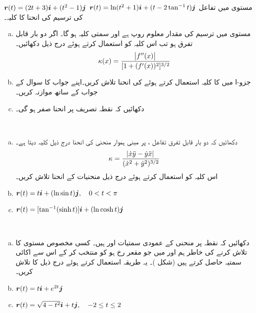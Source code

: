 ${{\boldsymbol{r}}}(t)=(2t+3){\boldsymbol{i}}+(t^2-1){\boldsymbol{j}}$
${{\boldsymbol{r}}}(t)=\ln (t^2+1){\boldsymbol{i}}+(t-2\tan^{-1}t){\boldsymbol{j}}$
مستوی  میں تفاعل کی ترسیم کی انحنا کا کلیہ۔
\begin{enumerate}[a.]
\item
مستوی  میں ترسیم   کی مقدار معلوم روپ  ہے اور سمتی کلیہ  ہو گا۔ اگر  دو بار قابل تفرق ہو تب اس کلیہ کو استعمال کرتے ہوئے  درج ذیل دکھائیں۔
\begin{align*}
\kappa(x)=\frac{\abs{f''(x)}}{[1+(f'(x))^2]^{3/2}}
\end{align*} 
\item
جزو-ا میں  کا کلیہ  استعمال کرتے ہوئے   کی انحنا تلاش کریں۔اپنے جواب کا سوال  کے جواب کے ساتھ موازنہ کریں۔
\item
دکھائیں کہ نقطہ  تصریف پر انحنا صفر ہو گی۔ 
\end{enumerate}
\\
\begin{enumerate}[a.]
\item
دکھائیں کہ دو بار قابل تفرق تفاعل ،  پر مبنی ہموار منحنی   کی انحنا درج ذیل کلیہ دیتا ہے۔
\begin{align*}
\kappa=\frac{\abs{\dot{x}\ddot{y}-\dot{y}\ddot{x}}}{(\dot{x}^2+\dot{y}^2)^{3/2}}
\end{align*}
اس کلیہ کو استعمال کرتے ہوئے درج ذیل منحنیات کے انحنا تلاش کریں۔
\item
${{\boldsymbol{r}}}(t)=t{\boldsymbol{i}}+(\ln\sin t){\boldsymbol{j}},\quad 0<t<\pi$
\item
${{\boldsymbol{r}}}(t)=[\tan^{-1}(\sinh t)]{\boldsymbol{i}}+(\ln \cosh t){\boldsymbol{j}}$
\end{enumerate}
\\
\begin{enumerate}[a.]
\item
دکھائیں کہ نقطہ   پر منحنی   کے عمودی سمتیات  اور  ہیں۔
کسی مخصوص مستوی کا      تلاش کرنے کی خاطر ہم    اور  میں جو   مقعر رخ ہو کو منتخب کر کے اس سے اکائی سمتیہ حاصل کرتے ہیں  (شکل )۔ یہ طریقہ استعمال کرتے ہوئے درج ذیل کا  تلاش کریں۔
\item
${{\boldsymbol{r}}}(t)=t{\boldsymbol{i}}+e^{2t}{\boldsymbol{j}}$
\item
${{\boldsymbol{r}}}(t)=\sqrt{4-t^2}{\boldsymbol{i}}+t{\boldsymbol{j}},\quad -2\le t\le 2$
\end{enumerate}
